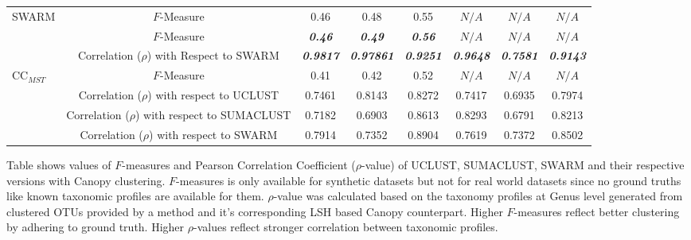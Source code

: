 \documentclass[10pt, conference, compsocconf]{IEEEtran}
\begin{document}
\begin{table}[t]
{\begin{tabular}{|l|c c c c| c c c|}
			\hline
			
			\multirow{1}{*}{SWARM} & $F$-Measure & 0.46 & 0.48 & 0.55 & $N/A$ & $N/A$ & $N/A$\\
						
			\hdashline
			
			\multirow{2}{*}{CC$_{SWARM}$} & $F$-Measure & \textit{\textbf{0.46}} & \textit{\textbf{0.49}} & \textit{\textbf{0.56}} & $N/A$ & $N/A$ & $N/A$\\
			& Correlation ($\rho$) with Respect to SWARM & \textit{\textbf{0.9817}} & \textit{\textbf{0.97861}} & \textit{\textbf{0.9251}} & \textit{\textbf{0.9648}} & \textit{\textbf{0.7581}} & \textit{\textbf{0.9143}}\\
			
			\hline
			
			\multirow{4}{*}{CC$_{MST}$} & $F$-Measure & 0.41 & 0.42 & 0.52 & $N/A$ & $N/A$ & $N/A$\\
			& Correlation ($\rho$) with respect to UCLUST & 0.7461 & 0.8143 & 0.8272 & 0.7417 & 0.6935 & 0.7974 \\ & Correlation ($\rho$) with respect to SUMACLUST & 0.7182 & 0.6903 & 0.8613 & 0.8293 & 0.6791 & 0.8213 \\  & Correlation ($\rho$) with respect to SWARM & 0.7914 & 0.7352 & 0.8904 & 0.7619 & 0.7372 & 0.8502  \\
			
			\hline
			
		\end{tabular}
	}
	\small
	\begin{tablenotes}
		\item Table shows values of $F$-measures and Pearson Correlation Coefficient ($\rho$-value) of UCLUST, SUMACLUST, SWARM and their respective versions with Canopy clustering. $F$-measures is only available for synthetic datasets but not for real world datasets since no ground truths like known taxonomic profiles are available for them. $\rho$-value was calculated based on the taxonomy profiles at Genus level generated from clustered OTUs provided by a method and it's corresponding LSH based Canopy counterpart. Higher $F$-measures reflect better clustering by adhering to ground truth. Higher $\rho$-values reflect stronger correlation between taxonomic profiles.        
	\end{tablenotes}
	
\end{table} 
\end{document}
